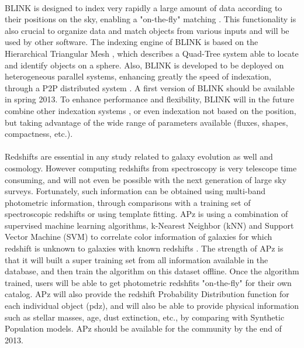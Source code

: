 \documentclass[11pt,twoside]{article}
\begin{document}
\\
BLINK is designed to index very rapidly a large amount of data according to their positions on the sky, enabling a "on-the-fly" matching \citep{blink}. This functionality is also crucial to organize data and match objects from various inputs and will be used by other software.
The indexing engine of BLINK is based on the Hierarchical Triangular Mesh \citep[HTM -][]{htm}, which describes a Quad-Tree system able to locate and identify objects on a sphere. Also, BLINK is developed to be deployed on heterogeneous parallel systems, enhancing greatly the speed of indexation, through a P2P distributed system \citep[c.f.][]{tang10}. A first version of BLINK should be available in spring 2013.
To enhance performance and flexibility, BLINK will in the future combine other indexation systems \citep[HEALPix -][]{healpix}, or even indexation not based on the position, but taking advantage of the wide range of parameters available (fluxes, shapes, compactness, etc.).\\

\\
Redshifts are essential in any study related to galaxy evolution as well and cosmology. However computing redshifts from spectroscopy is very telescope time consuming, and will not even be possible with the next generation of large sky surveys. Fortunately, such information can be obtained using multi-band photometric information, through comparisons with a training set of spectroscopic redshifts or using template fitting.
APz is using a combination of supervised machine learning algorithms, k-Nearest Neighbor (kNN) and Support Vector Machine (SVM) to correlate color information of galaxies for which redshift is unknown to galaxies with known redshifts \citep[refer to e.g.,][]{bb10}. The strength of APz is that it will built a super training set from all information available in the database, and then train the algorithm on this dataset offline. Once the algorithm trained, users will be able to get photometric redshfits "on-the-fly" for their own catalog. APz will also provide the redshift Probability Distribution function for each individual object (pdz), and will also be able to provide physical information such as stellar masses, age, dust extinction, etc., by comparing with Synthetic Population models. APz should be available for the community by the end of 2013.\\
\end{document}
